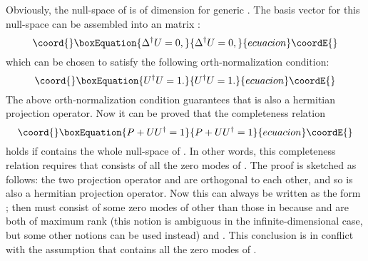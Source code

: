\documentclass[a4paper,a4paper]{article}
\begin{document}
Obviously, the null-space of \coordHE{} is of \coordHE{}
dimension for generic \coordHE{}. The basis vector for this null-space
can be assembled into an \coordHE{} matrix \coordHE{}:
\begin{equation}\coord{}\boxEquation{
\Delta^\dag U=0,
}{
\Delta^\dag U=0,
}{ecuacion}\coordE{}\end{equation}
which can be chosen to satisfy the following orth-normalization
condition:
\begin{equation}\coord{}\boxEquation{
U^\dag U=1.
}{
U^\dag U=1.
}{ecuacion}\coordE{}\end{equation}
The above orth-normalization condition guarantees that \coordHE{}
is also a hermitian projection operator. Now it can be proved that
the completeness relation
\begin{equation}\coord{}\boxEquation{
\label{complete}
P+UU^\dag=1
}{
P+UU^\dag=1
}{ecuacion}\coordE{}\end{equation}
holds if \coordHE{} contains the whole null-space of \myHighlight{$\Delta^\dagger$}\coordHE{}. In
other words, this completeness relation requires that \coordHE{} consists
of all the zero modes of \myHighlight{$\Delta^\dagger$}\coordHE{}. The proof is sketched
as follows: the two projection operator \coordHE{} and \coordHE{} are
orthogonal to each other, and so \coordHE{} is also a hermitian
projection operator. Now this can always be written as the form
\coordHE{}; then \coordHE{} must consist of some zero modes of
\myHighlight{$\Delta^\dagger$}\coordHE{} other than those in \coordHE{} because \myHighlight{$\Delta$}\coordHE{} and \coordHE{}
are both of maximum rank (this notion is ambiguous in the
infinite-dimensional case, but some other notions can be used
instead) and \coordHE{}. This conclusion is in conflict with the
assumption that \coordHE{} contains all the zero modes of
\myHighlight{$\Delta^\dagger$}\coordHE{}.
\end{document}

